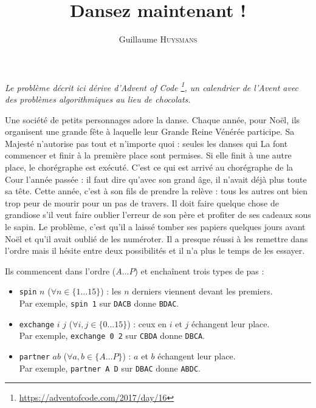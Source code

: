 \documentclass[11pt,a4paper,oneside]{book}
\title{Dansez maintenant !}
\author{Guillaume \textsc{Huysmans}}%
\begin{document}
\maketitle
\emph{Le problème décrit ici dérive d'Advent of Code
\footnote{\url{https://adventofcode.com/2017/day/16}},
un calendrier de l'Avent avec
des problèmes algorithmiques au lieu de chocolats.}

Une société de petits personnages adore la danse. Chaque année, pour Noël, ils
organisent une grande fête à laquelle leur Grande Reine Vénérée participe. Sa
Majesté n'autorise pas tout et n'importe quoi : seules les danses qui La font
commencer et finir à la première place sont permises.
Si elle finit à une autre place, le
chorégraphe est exécuté. C'est ce qui est arrivé au chorégraphe de la Cour
l'année passée : il faut dire qu'avec son grand âge, il n'avait déjà plus toute
sa tête. Cette année, c'est à son fils de prendre la relève : tous les autres
ont bien trop peur de mourir pour un pas de travers. Il doit faire quelque
chose de grandiose s'il veut faire oublier l'erreur de son père et profiter de
ses cadeaux sous le sapin.
Le problème, c'est qu'il a laissé tomber ses papiers quelques
jours avant Noël et qu'il avait oublié de les numéroter.
Il a presque réussi à les remettre dans l'ordre mais il hésite entre deux
possibilités et il n'a plus le temps de les essayer.

Ils commencent dans l'ordre ($A\dots P$) et enchaînent trois types de pas :
\begin{itemize}
\item \texttt{spin} $n$ ($\forall n \in \{1\dots15\}$) :
	les $n$ derniers viennent devant les premiers. \\
	Par exemple, \texttt{spin 1} sur \texttt{DACB} donne \texttt{BDAC}.
\item \texttt{exchange} $i$ $j$ ($\forall i,j \in \{0\dots15\}$) :
	ceux en $i$ et $j$ échangent leur place. \\
	Par exemple, \texttt{exchange 0 2} sur \texttt{CBDA} donne \texttt{DBCA}.
\item \texttt{partner} $a b$ ($\forall a,b \in \{A\dots P\}$) :
	$a$ et $b$ échangent leur place.
	 \\
	Par exemple, \texttt{partner A D} sur \texttt{DBAC} donne \texttt{ABDC}.
\end{itemize}
\end{document}
